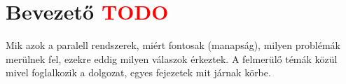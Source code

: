 \chapter*{Bevezető \textcolor{red}{TODO}}

Mik azok a paralell rendszerek, miért fontosak (manapság), milyen problémák merülnek fel, ezekre eddig milyen válaszok érkeztek. A felmerülő témák közül mivel foglalkozik a dolgozat, egyes fejezetek mit járnak körbe.

